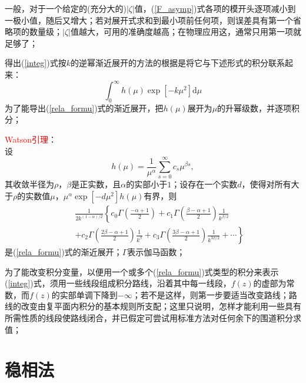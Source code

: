 \documentclass[11pt,a4paper]{article}
\newcommand{\dif}{\mathrm{d}}
\begin{document}
一般，对于一个给定的(充分大的)$|\zeta|$值，(\ref{F_asymp})式各项的模开头逐项减小到一极小值，随后又增大；若对展开式求和到最小项前任何项，则误差具有第一个省略项的数量级；$|\zeta|$值越大，可用的准确度越高；在物理应用这，通常只用第一项就足够了；

得出(\ref{integ})式按$k$的逆幂渐近展开的方法的根据是将它与下述形式的积分联系起来：
\begin{equation}
\int_0^{\infty} h(\mu) \exp[-k \mu^2] \dif \mu
\label{rela_formu}
\end{equation}
为了能导出(\ref{rela_formu})式的渐近展开，把$h(\mu)$展开为$\mu$的升幂级数，并逐项积分；

\textcolor{red}{Watson引理}： \\
设
\begin{equation}
h(\mu) = \frac{1}{\mu^{\alpha}} \sum_{s=0}^{\infty} c_s \mu^{\beta s} ,
\end{equation}
其收敛半径为$\rho$，$\beta$是正实数，且$\alpha$的实部小于$1$；设存在一个实数$d$，使得对所有大于$\rho$的实数值$\mu$，$\mu^{\alpha} \exp[-d \mu^2] h(\mu)$有界，则
\begin{eqnarray}
&& \frac{1}{2k^{(1-\alpha)/2}} \left\lbrace c_0 \Gamma\left(\frac{-\alpha +1}{2} \right) + c_1 \Gamma\left(\frac{\beta-\alpha +1}{2} \right) \frac{1}{k^{\beta/2}} \right. \\ \nonumber
&& \left. + c_2  \Gamma\left(\frac{2\beta-\alpha +1}{2} \right) \frac{1}{k^{\beta}}   +c_3  \Gamma\left(\frac{3\beta-\alpha +1}{2} \right) \frac{1}{k^{3\beta/2}} +\cdots        \right\rbrace
\end{eqnarray}
是(\ref{rela_formu})式的渐近展开；$\Gamma$表示伽马函数；

为了能改变积分变量，以便用一个或多个(\ref{rela_formu})式类型的积分来表示(\ref{integ})式，须用一些线段组成积分路线，沿着其中每一线段，$f(z)$的虚部为常数，而$f(z)$的实部单调下降到$-\infty$；若不是这样，则第一步要适当改变路线；路线的改变由复平面内积分的基本规则所支配；这里只说明，怎样才能利用一些具有所需性质的线段使路线闭合，并已假定可尝试用标准方法对任何余下的围道积分求值；



\section{稳相法}
\end{document}
